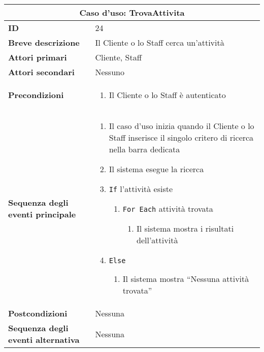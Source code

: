 \documentclass[a4paper]{report}
\begin{document}
\clearpage
\begin{table}[H]
\vspace*{-0cm}
\renewcommand{\arraystretch}{1.9}
\begin{tabular}{|p{3.9cm}|p{9.9cm}|}
\hline
\multicolumn{2}{|c|}{\textbf{Caso d’uso: TrovaAttivita}} \\ \hline
	\textbf{ID} & 24 \\ \hline
	\textbf{Breve descrizione} & Il Cliente o lo Staff cerca un’attività \\ \hline
	\textbf{Attori primari} & Cliente, Staff \\ \hline
	\textbf{Attori secondari} & Nessuno \\ \hline
	\textbf{Precondizioni} & \begin{enumerate}[leftmargin=14pt,label=\arabic*.,labelsep=0.5em,topsep=0pt,partopsep=0pt,parsep=0pt,itemsep=0pt]
    \item Il Cliente o lo Staff è autenticato
\end{enumerate} \\ \hline
	\textbf{Sequenza degli eventi principale} & \begin{enumerate}[leftmargin=14pt,label=\arabic*.,labelsep=0.5em,topsep=0pt,partopsep=0pt,parsep=0pt,itemsep=0pt]
    \item Il caso d’uso inizia quando il Cliente o lo Staff inserisce il singolo critero di ricerca nella barra dedicata 
    \item Il sistema esegue la ricerca
    \item \texttt{If} l’attività esiste
    \begin{enumerate}[label=\arabic{enumi}.\arabic*.,leftmargin=22pt,labelsep=0.5em,topsep=0pt,partopsep=0pt,parsep=0pt,itemsep=0pt]
        \item \texttt{For Each} attività trovata
        \begin{enumerate}[label=\arabic{enumi}.\arabic{enumii}.\arabic*.,leftmargin=22pt,labelsep=0.5em,topsep=0pt,partopsep=0pt,parsep=0pt,itemsep=0pt]
            \item Il sistema mostra i risultati dell'attività
        \end{enumerate}
    \end{enumerate}
    \item \texttt{Else}
    \begin{enumerate}[label=\arabic{enumi}.\arabic*.,leftmargin=22pt,labelsep=0.5em,topsep=0pt,partopsep=0pt,parsep=0pt,itemsep=0pt]
        \item Il sistema mostra “Nessuna attività trovata”
    \end{enumerate}
\end{enumerate} \\ \hline
	\textbf{Postcondizioni} & Nessuna \\ \hline
	\textbf{Sequenza degli eventi alternativa} & Nessuna \\ \hline
\end{tabular}
\end{table}
\end{document}
